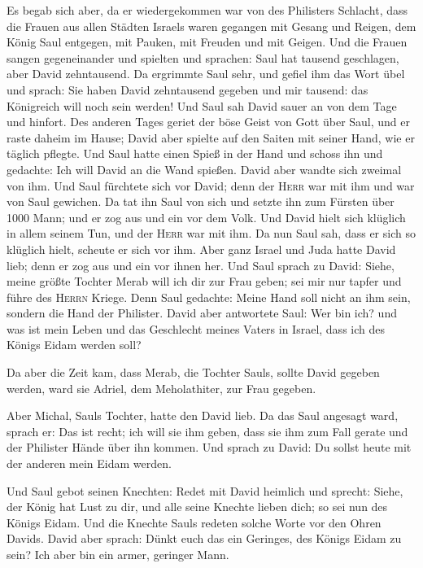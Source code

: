  Es begab sich aber, da er wiedergekommen war von des
Philisters Schlacht, dass die Frauen aus allen Städten Israels waren
gegangen mit Gesang und Reigen, dem König Saul entgegen, mit Pauken, mit
Freuden und mit Geigen.  Und die Frauen sangen
gegeneinander und spielten und sprachen: Saul hat tausend geschlagen,
aber David zehntausend.  Da ergrimmte Saul sehr, und
gefiel ihm das Wort übel und sprach: Sie haben David zehntausend gegeben
und mir tausend: das Königreich will noch sein werden! 
Und Saul sah David sauer an von dem Tage und hinfort. 
Des anderen Tages geriet der böse Geist von Gott über Saul, und er raste
daheim im Hause; David aber spielte auf den Saiten mit seiner Hand, wie
er täglich pflegte. Und Saul hatte einen Spieß in der Hand
 und schoss ihn und gedachte: Ich will David an die Wand
spießen. David aber wandte sich zweimal von ihm.  Und
Saul fürchtete sich vor David; denn der \textsc{Herr} war mit ihm und
war von Saul gewichen.  Da tat ihn Saul von sich und
setzte ihn zum Fürsten über 1000 Mann; und er zog aus und ein vor dem
Volk.  Und David hielt sich klüglich in allem seinem Tun,
und der \textsc{Herr} war mit ihm.  Da nun Saul sah, dass
er sich so klüglich hielt, scheute er sich vor ihm.  Aber
ganz Israel und Juda hatte David lieb; denn er zog aus und ein vor ihnen
her.  Und Saul sprach zu David: Siehe, meine größte
Tochter Merab will ich dir zur Frau geben; sei mir nur tapfer und führe
des \textsc{Herrn} Kriege. Denn Saul gedachte: Meine Hand soll nicht an
ihm sein, sondern die Hand der Philister.  David aber
antwortete Saul: Wer bin ich? und was ist mein Leben und das Geschlecht
meines Vaters in Israel, dass ich des Königs Eidam werden soll?

 Da aber die Zeit kam, dass Merab, die Tochter Sauls,
sollte David gegeben werden, ward sie Adriel, dem Meholathiter, zur Frau
gegeben.

 Aber Michal, Sauls Tochter, hatte den David lieb. Da das
Saul angesagt ward, sprach er: Das ist recht;  ich will
sie ihm geben, dass sie ihm zum Fall gerate und der Philister Hände über
ihn kommen. Und sprach zu David: Du sollst heute mit der anderen mein
Eidam werden.

 Und Saul gebot seinen Knechten: Redet mit David heimlich
und sprecht: Siehe, der König hat Lust zu dir, und alle seine Knechte
lieben dich; so sei nun des Königs Eidam.  Und die
Knechte Sauls redeten solche Worte vor den Ohren Davids. David aber
sprach: Dünkt euch das ein Geringes, des Königs Eidam zu sein? Ich aber
bin ein armer, geringer Mann.

